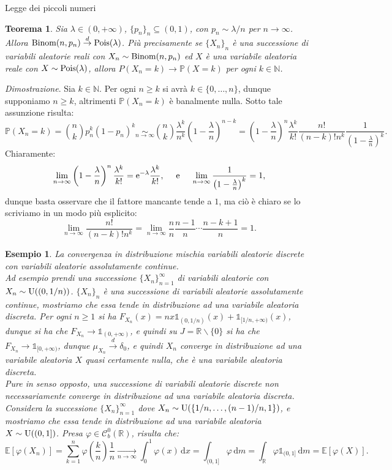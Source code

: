 \documentclass[11pt]{book}
\makeatletter
\theoremstyle{Definizione}
\theoremstyle{TeoremaProposizioneLemmaCorollario}
\newtheorem{myteo}{Teorema}[section]
\theoremstyle{OsservazioneNota}
\newtheorem{myes}{Esempio}[section]
\renewenvironment{proof}[1][\proofname]{\par
  \normalfont \topsep6\p@\@plus6\p@\relax
  \trivlist
  \item[\hskip\labelsep
        \itshape
    #1\@addpunct{.}]\ignorespaces
}{%
  \endtrivlist\@endpefalse
}
\newcommand{\R}{\mathbb{R}}
\newcommand{\N}{\mathbb{N}}
\newcommand{\tolto}{\smallsetminus}
\renewcommand{\P}{\mathbb{P}}
\renewcommand{\d}{\mathrm{d}}
\newcommand{\dm}{\,\d \textit{m}}
\newcommand{\dx}{\,\d x}
\newcommand{\e}{\textup{e}}
\newcommand{\E}{\mathbb{E}}
\newcommand{\uno}[1]{\mathds{1}_{#1}}
\newcommand{\tod}{\overset{d}{\to}}
\renewenvironment{proof}{\textsl{Dimostrazione}.}{}
\makeatother
\begin{document}
\begin{boxteo}{Legge dei piccoli numeri}
\begin{myteo}
Sia $\lambda\in (0,+\infty)$, $\{p_n\}_n \subseteq (0,1)$, con $p_n \sim \lambda/n$ per $n\to\infty$. Allora $\textup{Binom}(n,p_n) \tod \textup{Pois}(\lambda)$. Più precisamente se $\{X_n\}_n$ è una successione di variabili aleatorie reali con $X_n \sim \textup{Binom}(n,p_n)$ ed $X$ è una variabile aleatoria reale con $X \sim \textup{Pois}(\lambda)$, allora $P(X_n = k) \to \P(X = k)$ per ogni $k\in \N$.
\end{myteo}
\tcblower
\begin{proof}
Sia $k\in \N$. Per ogni $n\geq k$ si avrà $k\in \{0,\dots,n\}$, dunque supponiamo $n\geq k$, altrimenti $\P(X_n = k)$ è banalmente nulla. Sotto tale assunzione risulta:
$$
\P(X_n= k) = \binom{n}{k} p_n^k (1-p_n)^k \underset{n\to\infty}{\sim} \binom{n}{k} \frac{\lambda^k}{n^k}\left(1-\frac{\lambda}{n}\right)^{n-k} = \left(1-\frac{\lambda}{n}\right)^n\frac{\lambda^k}{k!}\frac{n!}{(n-k)!n^k}\frac{1}{\left(1-\frac{\lambda}{n}\right)^k}.
$$
Chiaramente:
$$
\lim_{n\to\infty}\left(1-\frac{\lambda}{n}\right)^n\frac{\lambda^k}{k!} = \e^{-\lambda}\frac{\lambda^k}{k!},\quad\textup{ e }\quad \lim_{n\to\infty} \frac{1}{\left(1-\frac{\lambda}{n}\right)^k} = 1,
$$
dunque basta osservare che il fattore mancante tende a $1$, ma ciò è chiaro se lo scriviamo in un modo più esplicito:
$$
\lim_{n\to\infty} \frac{n!}{(n-k)!n^k} = \lim_{n\to\infty} \frac{n}{n}\frac{n-1}{n}\cdots\frac{n-k+1}{n} = 1.
$$
\end{proof}
\end{boxteo}
\begin{myes}
La convergenza in distribuzione mischia variabili aleatorie discrete con variabili aleatorie assolutamente continue.\\
Ad esempio prendi una successione $\{X_n\}_{n = 1}^\infty$ di variabili aleatorie con $X_n \sim \textup{U}((0,1/n))$. $\{X_n\}_n$ è una successione di variabili aleatorie assolutamente continue, mostriamo che essa tende in distribuzione ad una variabile aleatoria discreta. Per ogni $n\geq 1$ si ha $F_{X_n}(x) = nx \uno{(0,1/n)}(x)+\uno{[1/n,+\infty)}(x)$, dunque si ha che $F_{X_n} \to \uno{(0,+\infty)}$, e quindi su $J = \R \tolto \{0\}$ si ha che $F_{X_n} \to \uno{[0,+\infty)}$, dunque $\mu_{X_n}\tod \delta_0$, e quindi $X_n$ converge in distribuzione ad una variabile aleatoria $X$ quasi certamente nulla, che è una variabile aleatoria discreta.\\
Pure in senso opposto, una successione di variabili aleatorie discrete non necessariamente converge in distribuzione ad una variabile aleatoria discreta. Considera la successione $\{X_n\}_{n = 1}^\infty$ dove $X_n \sim \textup{U}(\{1/n,\dots,(n-1)/n,1\})$, e mostriamo che essa tende in distribuzione ad una variabile aleatoria $X \sim \textup{U}((0,1])$. Presa $\varphi\in \mathcal{C}_b^0(\R)$, risulta che:
$$
\E[\varphi(X_n)] = \sum_{k = 1}^n \varphi\left(\frac{k}{n}\right)\frac{1}{n}\underset{n\to \infty}{\longrightarrow} \int_0^1 \varphi(x)\dx = \int_{(0,1]}\varphi \dm = \int_\R \varphi \uno{(0,1]}\dm = \E[\varphi(X)].
$$
\end{myes}
\end{document}
